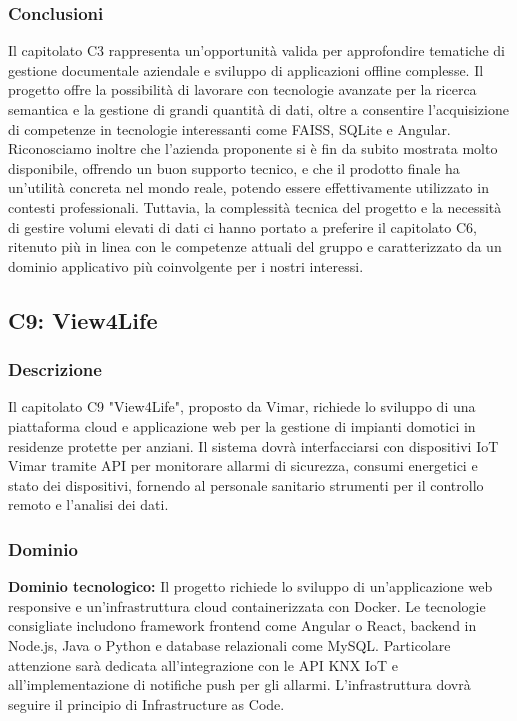 \documentclass[11pt,a4paper]{article}
\begin{document}
\subsubsection{Conclusioni}
Il capitolato C3 rappresenta un'opportunità valida per approfondire tematiche di gestione documentale aziendale e sviluppo di applicazioni offline complesse. Il progetto offre la possibilità di lavorare con tecnologie avanzate per la ricerca semantica e la gestione di grandi quantità di dati, oltre a consentire l'acquisizione di competenze in tecnologie interessanti come FAISS, SQLite e Angular. Riconosciamo inoltre che l'azienda proponente si è fin da subito mostrata molto disponibile, offrendo un buon supporto tecnico, e che il prodotto finale ha un'utilità concreta nel mondo reale, potendo essere effettivamente utilizzato in contesti professionali. Tuttavia, la complessità tecnica del progetto e la necessità di gestire volumi elevati di dati ci hanno portato a preferire il capitolato C6, ritenuto più in linea con le competenze attuali del gruppo e caratterizzato da un dominio applicativo più coinvolgente per i nostri interessi.

\subsection{C9: View4Life}

\subsubsection{Descrizione}
Il capitolato C9 "View4Life", proposto da Vimar, richiede lo sviluppo di una piattaforma cloud e applicazione web per la gestione di impianti domotici in residenze protette per anziani. Il sistema dovrà interfacciarsi con dispositivi IoT Vimar tramite API per monitorare allarmi di sicurezza, consumi energetici e stato dei dispositivi, fornendo al personale sanitario strumenti per il controllo remoto e l'analisi dei dati.

\subsubsection{Dominio}
\textbf{Dominio tecnologico:} Il progetto richiede lo sviluppo di un'applicazione web responsive e un'infrastruttura cloud containerizzata con Docker. Le tecnologie consigliate includono framework frontend come Angular o React, backend in Node.js, Java o Python e database relazionali come MySQL. Particolare attenzione sarà dedicata all'integrazione con le API KNX IoT e all'implementazione di notifiche push per gli allarmi. L'infrastruttura dovrà seguire il principio di Infrastructure as Code.
\end{document}
